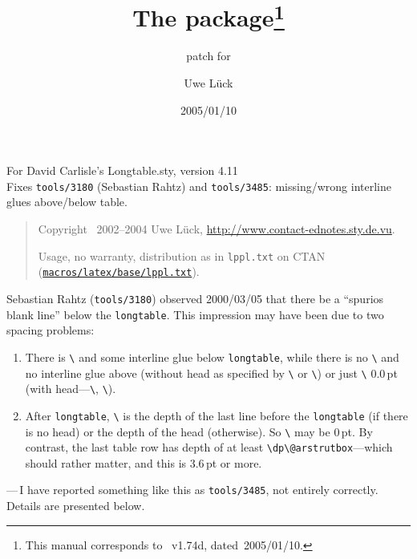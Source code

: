 \documentclass[DIV=9, parskip=half, pagesize=auto]{scrartcl}
\title{The \pkg{ltabptch} package\thanks{This manual corresponds to \pkg{ltabptch}~v1.74d, dated~2005/01/10.}}
\subtitle{patch for \pkg{Longtable}}
\author{Uwe Lück}
\date{2005/01/10}
\makeatletter
\newcommand*{\pkg}[1]{\textsf{#1}}
\newcommand*{\cs}[1]{\texttt{\textbackslash#1}}
\newcommand*{\cmd}[1]{\cs{\expandafter\@gobble\string#1}}
\newcommand*{\env}[1]{\texttt{#1}}
\makeatother
\begin{document}
\maketitle

For David Carlisle's \pkg{Longtable.sty}, version 4.11 \\
Fixes \texttt{tools/3180} (Sebastian Rahtz) and \texttt{tools/3485}: 
missing/wrong interline glues above/below table. 
  
\begin{quote}
  \small
  Copyright \textcopyright\ 2002--2004 Uwe Lück, 
  \url{http://www.contact-ednotes.sty.de.vu}. 
  
  Usage, no warranty, distribution as in \texttt{lppl.txt} on CTAN 
  (\href{http://www.ctan.org/pub/tex-archive/macros/latex/base/lppl.txt}{\texttt{macros\slash latex\slash base\slash lppl.txt}}).
\end{quote}



\renewcommand*{\labelenumi}{(\theenumi)}

Sebastian Rahtz (\texttt{tools/3180}) observed 2000/03/05 that there be 
a ``spurios blank line'' below the \env{longtable}. This impression 
may have been due to two spacing problems: 
%
\begin{enumerate}
\item There is \cmd{\parskip} and some interline glue below \env{longtable}, 
  while there is no \cmd{\parskip} and no interline glue above 
  (without head as specified by \cmd{\endhead} or \cmd{\firstendhead}) 
  or just \cmd{\lineskip} 0.0\,pt (with head---\cmd{\endhead}, \cmd{\endfirsthead}). 
\item After \env{longtable}, \cmd{\prevdepth} is the depth of the last line 
  before the \env{longtable} (if there is no head) or the depth of the 
  head (otherwise). So \cmd{\prevdepth} may be 0\,pt. By contrast, the 
  last table row has depth of at least \verb+\dp\@arstrutbox+---which 
  should rather matter, and this is 3.6\,pt or more. 
\end{enumerate}
%
---\,I have reported something like this as \texttt{tools/3485}, not 
entirely correctly. Details are presented below. 


\end{document}
